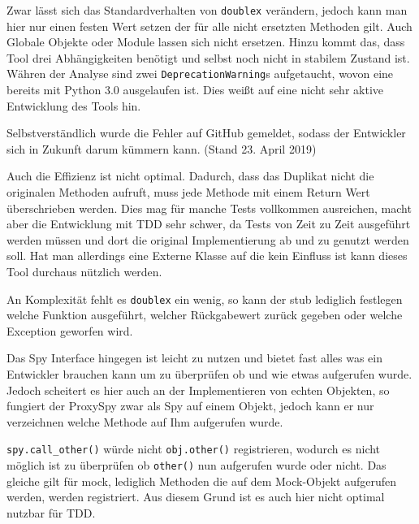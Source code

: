 Zwar lässt sich das Standardverhalten von \lstinline{doublex} verändern, jedoch
kann man hier nur einen festen Wert setzen der für alle nicht ersetzten Methoden
gilt. Auch Globale Objekte oder Module lassen sich nicht ersetzen. Hinzu kommt
das, dass Tool drei Abhängigkeiten benötigt und selbst noch nicht in stabilem
Zustand ist. Währen der Analyse sind zwei \lstinline{DeprecationWarning}s
aufgetaucht, wovon eine bereits mit Python 3.0 ausgelaufen ist. Dies weißt auf
eine nicht sehr aktive Entwicklung des Tools hin.

Selbstverständlich wurde die Fehler auf GitHub gemeldet, sodass der Entwickler
sich in Zukunft darum kümmern kann. (Stand 23. April 2019)

Auch die Effizienz ist nicht optimal. Dadurch, dass das Duplikat nicht die
originalen Methoden aufruft, muss jede Methode mit einem Return Wert
überschrieben werden. Dies mag für manche Tests vollkommen ausreichen, macht
aber die Entwicklung mit TDD sehr schwer, da Tests von Zeit zu Zeit ausgeführt
werden müssen und dort die original Implementierung ab und zu genutzt
werden soll. Hat man allerdings eine Externe Klasse auf die kein Einfluss ist
kann dieses Tool durchaus nützlich werden.

An Komplexität fehlt es \lstinline{doublex} ein wenig, so kann der \Gls{stub}
lediglich festlegen welche Funktion ausgeführt, welcher Rückgabewert zurück
gegeben oder welche Exception geworfen wird.

Das Spy Interface hingegen ist leicht zu nutzen und bietet fast alles was ein
Entwickler brauchen kann um zu überprüfen ob und wie etwas aufgerufen wurde.
Jedoch scheitert es hier auch an der Implementieren von echten Objekten, so
fungiert der ProxySpy zwar als Spy auf einem Objekt, jedoch kann er nur
verzeichnen welche Methode auf Ihm aufgerufen wurde.

\lstinline{spy.call_other()} würde nicht \lstinline{obj.other()} registrieren,
wodurch es nicht möglich ist zu überprüfen ob \lstinline{other()} nun aufgerufen
wurde oder nicht. Das gleiche gilt für \Gls{mock}, lediglich Methoden die auf
dem Mock-Objekt aufgerufen werden, werden registriert. Aus diesem Grund ist es
auch hier nicht optimal nutzbar für TDD.